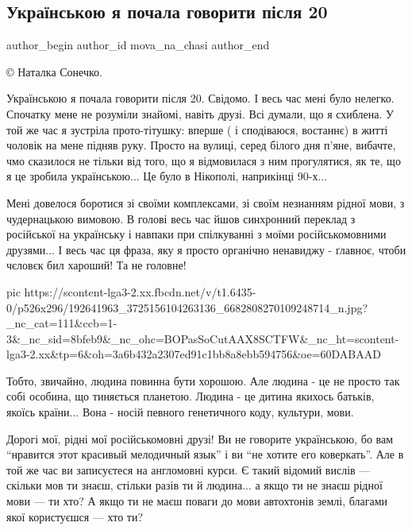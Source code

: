  
 
 
 
 
 
\subsection{Українською я почала говорити після 20}
\label{sec:29_05_2021.fb.mova_na_chasi.1.mova}
\ifcmt
 author_begin
   author_id mova_na_chasi
 author_end
\fi

©️ Наталка Сонечко.

Українською я почала говорити після 20. Свідомо. І весь час мені було нелегко.
Спочатку мене не розуміли знайомі, навіть друзі. Всі думали, що я схиблена. У
той же час я зустріла прото-тітушку: вперше ( і сподіваюся, востаннє) в житті
чоловік на мене підняв руку. Просто на вулиці, серед білого дня п'яне, вибачте,
чмо сказилося не тільки від того, що я відмовилася з ним прогулятися, як те, що
я це зробила українською... Це було в Нікополі, наприкінці 90-х... 

Мені довелося боротися зі своїми комплексами, зі своїм незнанням рідної мови, з
чудернацькою вимовою. В голові весь час йшов синхронний переклад з російської
на українську і навпаки при спілкуванні з моїми російськомовними друзями... І
весь час ця фраза, яку я просто органічно ненавиджу - ґлавноє, чтоби чєловєк
бил хароший! Та не головне! 

\ifcmt
  pic https://scontent-lga3-2.xx.fbcdn.net/v/t1.6435-0/p526x296/192641963_3725156104263136_6682808270109248714_n.jpg?_nc_cat=111&ccb=1-3&_nc_sid=8bfeb9&_nc_ohc=BOPasSoCutAAX8SCTFW&_nc_ht=scontent-lga3-2.xx&tp=6&oh=3a6b432a2307ed91c1bb8a8ebb594756&oe=60DABAAD
\fi

Тобто, звичайно, людина повинна бути хорошою. Але людина - це не просто так
собі особина, що тиняється планетою. Людина - це дитина якихось батьків, якоїсь
країни... Вона - носій певного  генетичного коду, культури, мови. 

Дорогі мої, рідні мої російськомовні друзі! Ви не говорите українською, бо вам
\enquote{нравится этот красивый мелодичный язык} і ви \enquote{не хотите его коверкать}. Але в
той же час ви записуєтеся на англомовні курси. Є такий відомий вислів — скільки
мов ти знаєш, стільки разів ти й людина... а якщо ти не знаєш рідної мови — ти
хто? А якщо ти не маєш поваги до мови автохтонів землі, благами якої
користуєшся — хто ти? 

